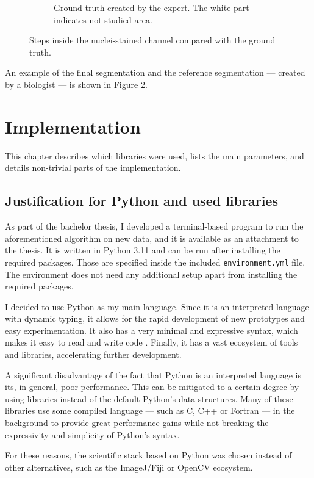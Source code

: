 \documentclass[
  digital,     %
  oneside,     %
  nosansbold,  %
  nocolorbold, %
  lof,         %
  lot,         %
]{fithesis4}
\begin{document}
\begin{figure}
\begin{subfigure}[t]{0.45\textwidth}
        \caption{Ground truth created by the expert. The white part indicates
        not-studied area.}
        \label{fig:ground-truth-crop}
    \end{subfigure}
    \caption{Steps inside the nuclei-stained channel compared with the ground
    truth.}
\end{figure}

An example of the final segmentation and the reference segmentation --- created by a
biologist --- is shown in Figure \ref{fig:ground-truth-crop}.

\chapter{Implementation}
\label{chp:implementation}
This chapter describes which libraries were used, lists the main parameters, and
details non-trivial parts of the implementation.

\section{Justification for Python and used libraries}
As part of the bachelor thesis, I developed a terminal-based program to run the
aforementioned algorithm on new data, and it is available as an attachment to the
thesis. It is written in Python 3.11 and can be run after installing the
required packages. Those are specified inside the included
\texttt{environment.yml} file. The environment does not need any additional setup
apart from installing the required packages.

I decided to use Python as my main language. Since it is an interpreted language
with dynamic typing, it allows for the rapid development of new prototypes and easy
experimentation. It also has a very minimal and expressive syntax, which makes
it easy to read and write code \cite{python-docs-tutorial}. Finally, it has a
vast ecosystem of tools and libraries, accelerating further development. 

A significant disadvantage of the fact that Python is an interpreted language
is its, in general, poor performance. This can be mitigated to a certain degree
by using libraries instead of the default Python's data structures. Many of
these libraries use some compiled language --- such as C, C++ or Fortran --- in
the background to provide great performance gains while not breaking
the expressivity and simplicity of Python's syntax.

For these reasons, the scientific stack based on Python was chosen instead of
other alternatives, such as the ImageJ/Fiji or OpenCV ecosystem.
\end{document}
